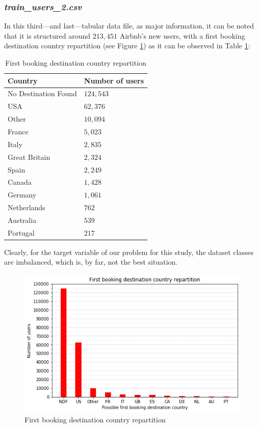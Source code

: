 \documentclass[twocolumn, switch]{article}
\begin{document}
\subsubsection{\textit{train\_users\_2.csv}}

In this third---and last---tabular data file, as major information, it can be noted that it is structured around $213,451$ Airbnb's new users, with a first booking destination country repartition (see Figure \ref{fig:repartition}) as it can be observed in Table \ref{tab:repartition}:

\begin{table}[H]
\caption{First booking destination country repartition}
\centering
\begin{tabular}{ll}
\toprule
Country & Number of users \\
\midrule
No Destination Found & $124,543$ \\
USA & $62,376$ \\
Other & $10,094$ \\
France & $5,023$ \\
Italy & $2,835$ \\
Great Britain & $2,324$ \\
Spain & $2,249$ \\
Canada & $1,428$ \\
Germany & $1,061$ \\
Netherlands & $762$ \\
Australia & $539$ \\
Portugal & $217$ \\
\bottomrule
\end{tabular}
\label{tab:repartition}
\end{table}

Clearly, for the target variable of our problem for this study, the dataset classes are imbalanced, which is, by far, not the best situation.

\begin{figure}[H]
\centering
\includegraphics[scale=0.35]{../graphs/train_users_2_country_destination}
\caption{First booking destination country repartition}
\label{fig:repartition}
\end{figure}
\end{document}
